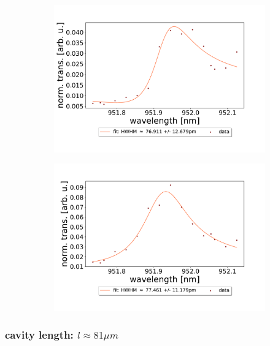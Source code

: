\begin{figure}[h!]
\begin{subfigure}[b]{0.49\textwidth}
        \includegraphics[width=\textwidth]{figures/results/double fano fits/20250326/251um_M3:M5_fit_9.pdf}
        \caption{}
        \label{fig:251um_M3:M5_fit_9}
    \end{subfigure}
    \begin{subfigure}[b]{0.49\textwidth}
        \includegraphics[width=\textwidth]{figures/results/double fano fits/20250326/251um_M3:M5_fit_10.pdf}
        \caption{}
        \label{fig:251um_M3:M5_fit_10}
    \end{subfigure}
\end{figure}

\clearpage
\subsubsection*{cavity length: $l \approx 81 \mu m$}

